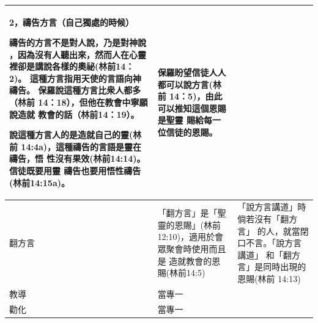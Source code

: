 \begin{table}[htbp]
\begin{tabular}{p{6.145em}|p{30.785em}|p{10.5em}}
2，禱告方言（自己獨處的時候）

禱告的方言不是對人說，乃是對神說
，因為沒有人聽出來，然而人在心靈
裡卻是講說各樣的奧祕(林前14：2)。
這種方言指用天使的言語向神禱告。
保羅說這種方言比衆人都多（林前
14：18），但他在教會中寧願說造就
教會的話（林前14：19）。

說這種方言人的是造就自己的靈(林前
14:4a)，這種禱告的言語是靈在禱告，悟
性沒有果效(林前14:14)。信徒既要用靈
禱告也要用悟性禱告(林前14:15a)。&保羅盼望信徒人人都可以說方言(林前
14：5)，由此可以推知這個恩賜是聖靈
賜給每一位信徒的恩賜。\\\midrule




翻方言&「翻方言」是「聖靈的恩賜」(林前
12:10)，適用於會眾聚會時使用而且是
造就教會的恩賜(林前14:5)
&
「說方言講道」時倘若沒有「翻方言」
的人，就當閉口不言。「說方言講道」
和「翻方言」是同時出現的恩賜(林前
14:13)\\\midrule

教導&當專一&\\\midrule
勸化&當專一&\\\midrule
\end{tabular}%
\end{table}%


